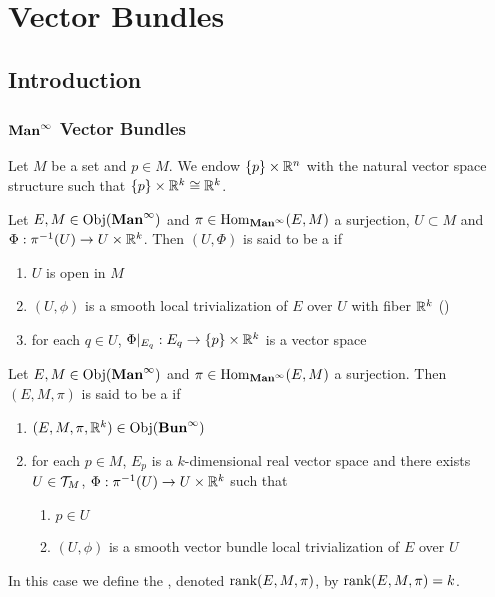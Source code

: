 \documentclass{book}
\begin{document}
	\newpage
	\chapter{Vector Bundles}
	
	\section{Introduction}
	
	\subsection{$\operatorname*{\text{\textbf{Man}}^{\infty}}$ Vector Bundles}

	\begin{note}
		Let $M$ be a set and $p \in M$. We endow $\{p\} \times \mathbb{R}^n$ with the natural vector space structure such that $\{p\} \times \mathbb{R}^k \cong \mathbb{R}^k$.
	\end{note}

	\begin{defn} 
		Let $E, M \in \operatorname{Obj}(\operatorname*{\text{\textbf{Man}}^{\infty}})$ and $\pi \in \operatorname{Hom}_{\operatorname*{\text{\textbf{Man}}^{\infty}}}(E, M)$ a surjection, $U \subset M$ and $\Phi: \pi^{-1}(U) \rightarrow U \times \mathbb{R}^k$. Then $(U, \Phi)$ is said to be a   if 
		\begin{enumerate}
			\item $U$ is open in $M$
			\item $(U, \phi)$ is a smooth local trivialization of $E$ over $U$ with fiber $\mathbb{R}^k$ ()
			\item for each $q \in U$, $\Phi|_{E_q}: E_q \rightarrow \{p\} \times \mathbb{R}^k$ is a vector space
		\end{enumerate}
	\end{defn}

	\begin{defn} 
		Let $E,M \in \operatorname{Obj}(\operatorname*{\text{\textbf{Man}}^{\infty}})$ and $\pi \in \operatorname{Hom}_{\operatorname*{\text{\textbf{Man}}^{\infty}}}(E, M)$ a surjection. Then $(E, M, \pi)$ is said to be a  if 
		\begin{enumerate}
			\item $(E, M, \pi, \mathbb{R}^k) \in \operatorname{Obj}(\operatorname*{\text{\textbf{Bun}}^{\infty}})$
			\item for each $p \in M$, $E_p$ is a $k$-dimensional real vector space and there exists $U \in \mathcal{T}_M$, $\Phi:\pi^{-1}(U) \rightarrow U \times \mathbb{R}^k$ such that
			\begin{enumerate}
				\item $p \in U$
				\item $(U, \phi)$ is a smooth vector bundle local trivialization of $E$ over $U$ 
			\end{enumerate}
		\end{enumerate}
		In this case we define the , denoted $\operatorname{\text{rank}} (E, M, \pi)$, by $ \operatorname{\text{rank}} (E, M, \pi) = k$.
	\end{defn}
\end{document}

